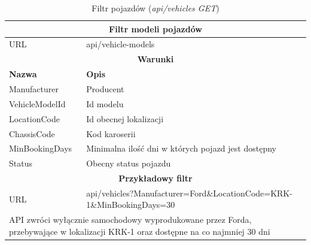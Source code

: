 \documentclass[eng,printmode,openany]{mgr}
\begin{document}
	\begin{table}[H]
		\caption{Filtr pojazdów (\textit{api/vehicles GET})}
		\begin{tabularx}{\textwidth}{|l|X|}
			\hline                                       							
			\multicolumn{2}{|c|}{\textbf{Filtr modeli pojazdów}}  							        	\\ \hline
			URL                 & api/vehicle-models     							             		\\ \hline
			\multicolumn{2}{|c|}{\textbf{Warunki}}     													\\ \hline
			\textbf{Nazwa}      & \textbf{Opis}              											\\ \hline
			Manufacturer        & Producent         													\\ \hline
			VehicleModelId      & Id modelu	        													\\ \hline
			LocationCode        & Id obecnej lokalizacji												\\ \hline
			ChassisCode         & Kod karoserii 	  													\\ \hline
			MinBookingDays      & Minimalna ilość dni w których pojazd jest dostępny					\\ \hline
			Status              & Obecny status pojazdu         										\\ \hline										
			\multicolumn{2}{|c|}{\textbf{Przykładowy filtr}}											\\ \hline
			URL                 & api/vehicles?Manufacturer=Ford\&LocationCode=KRK-1\&MinBookingDays=30	\\ \hline
			\multicolumn{2}{|X|}{API zwróci wyłącznie samochodowy wyprodukowane przez Forda, przebywające w lokalizacji KRK-1 oraz dostępne na co najmniej 30 dni}		\\ \hline
		\end{tabularx}
	\end{table}
	
\end{document}
